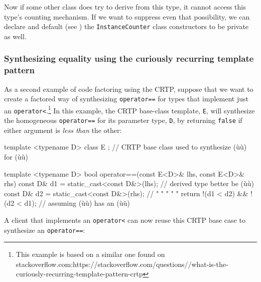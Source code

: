 \noindent Now if some other class does try to derive from this type, it cannot
access this type's counting mechanism. If we want to suppress even that
possibility, we can declare and default (see ) 
the \lstinline!InstanceCounter!
class constructors to be private as well.

\subsubsection[Synthesizing equality using the curiously recurring template pattern]{Synthesizing equality using the curiously recurring template pattern}\label{synthesizing-equality-using-crtp}

As a second example of code factoring using the CRTP, suppose that we want
to create a factored way of synthesizing \lstinline!operator==! for types
that implement just an \lstinline!operator<!.{\cprotect\footnote{This
example is based on a similar one found on stackoverflow.com:\linebreak[3]
  https://\linebreak[3]stackoverflow.\linebreak[3]com/\linebreak[3]questions//what-is-the-curiously-recurring-template-pattern-crtp}}
In this example, the CRTP base-class template, \lstinline!E!, will
synthesize the homogeneous \lstinline!operator==! for its parameter type,
\lstinline!D!, by returning \lstinline!false! if either argument is \emph{less
than} the other:

\begin{emcppslisting}[emcppsbatch=e5]
template <typename D>
class E { }; // CRTP base class used to synthesize (ù{}ù) for (ù{}ù)

template <typename D>
bool operator==(const E<D>& lhs, const E<D>& rhs)
{
    const D& d1 = static_cast<const D&>(lhs);  // derived type better be (ù{}ù)
    const D& d2 = static_cast<const D&>(rhs);  //    "     "     "    "  "
    return !(d1 < d2) && !(d2 < d1);           // assuming (ù{}ù) has an (ù{}ù)
}
\end{emcppslisting}
    
\noindent A client that implements an \lstinline!operator<! can now reuse this CRTP
base case to synthesize an \lstinline!operator==!:

